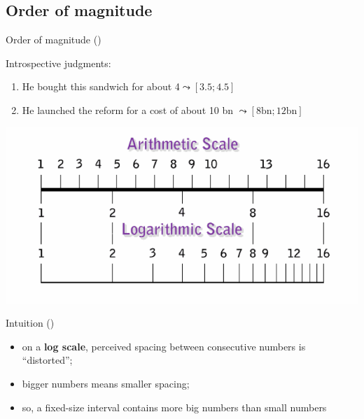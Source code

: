 \documentclass[xcolor=table, hyperref={pdfpagelabels=false}]{beamer}
\begin{document}
\subsection{Order of magnitude}
\begin{frame}{Order of magnitude \small (\cite{Egre2018pres})}
\begin{minipage}{.55\textwidth}
	Introspective judgments:
	\begin{enumerate}
		[square]
		\item He bought this sandwich for about 4\EUR $\leadsto [3.5; 4.5]$
		\item He launched the reform for a cost of about 10 bn \EUR $\leadsto [8\mbox{bn}; 12\mbox{bn}]$
		\label{end-enumerate}
	\end{enumerate}\pause
	\hspace*{-12mm}
	\includegraphics[width=1.2\textwidth]{./images/log_scale.png}
\end{minipage}
\begin{minipage}{.4\textwidth}
	\begin{block}{Intuition (\cite{Dehaene2003})}
		\begin{itemize}
			\item on a \textbf{log scale}, perceived spacing between consecutive numbers is ``distorted'';
			\item bigger numbers means smaller spacing;
			\item so, a fixed-size interval contains more big numbers than small numbers
		\end{itemize}
	\end{block}
\end{minipage}
\end{frame}
\end{document}
